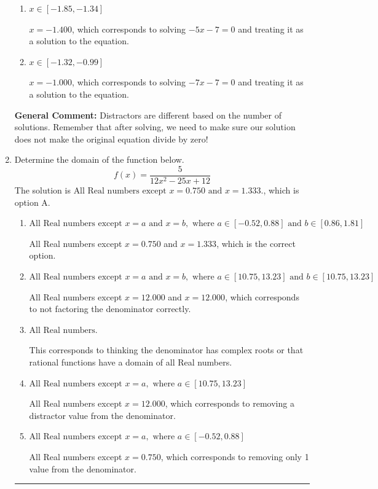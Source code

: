 \documentclass{extbook}[14pt]
\newcommand{\litem}[1]{\item #1

\rule{\textwidth}{0.4pt}}
\begin{document}
\begin{enumerate}
{\begin{enumerate}[label=\Alph*.]
$x = -1.400 \text{ and } x = -1.000$, which corresponds to solving $-5x -7 = 0$ and $-7x -7 = 0$ and treating them as solutions to the equation.
\item \( x \in [-1.85,-1.34] \)

$x = -1.400$, which corresponds to solving $-5x -7 = 0$ and treating it as a solution to the equation.
\item \( x \in [-1.32,-0.99] \)

$x = -1.000$, which corresponds to solving $-7x -7 = 0$ and treating it as a solution to the equation.
\end{enumerate}

\textbf{General Comment:} Distractors are different based on the number of solutions. Remember that after solving, we need to make sure our solution does not make the original equation divide by zero!
}
\litem{
Determine the domain of the function below.
\[ f(x) = \frac{5}{12x^{2} -25 x + 12} \]The solution is \( \text{All Real numbers except } x = 0.750 \text{ and } x = 1.333. \), which is option A.\begin{enumerate}[label=\Alph*.]
\item \( \text{All Real numbers except } x = a \text{ and } x = b, \text{ where } a \in [-0.52, 0.88] \text{ and } b \in [0.86, 1.81] \)

All Real numbers except $x = 0.750$ and $x = 1.333$, which is the correct option.
\item \( \text{All Real numbers except } x = a \text{ and } x = b, \text{ where } a \in [10.75, 13.23] \text{ and } b \in [10.75, 13.23] \)

All Real numbers except $x = 12.000$ and $x = 12.000$, which corresponds to not factoring the denominator correctly.
\item \( \text{All Real numbers.} \)

This corresponds to thinking the denominator has complex roots or that rational functions have a domain of all Real numbers.
\item \( \text{All Real numbers except } x = a, \text{ where } a \in [10.75, 13.23] \)

All Real numbers except $x = 12.000$, which corresponds to removing a distractor value from the denominator.
\item \( \text{All Real numbers except } x = a, \text{ where } a \in [-0.52, 0.88] \)

All Real numbers except $x = 0.750$, which corresponds to removing only 1 value from the denominator.
\end{enumerate}

}
\end{enumerate}
\end{document}
